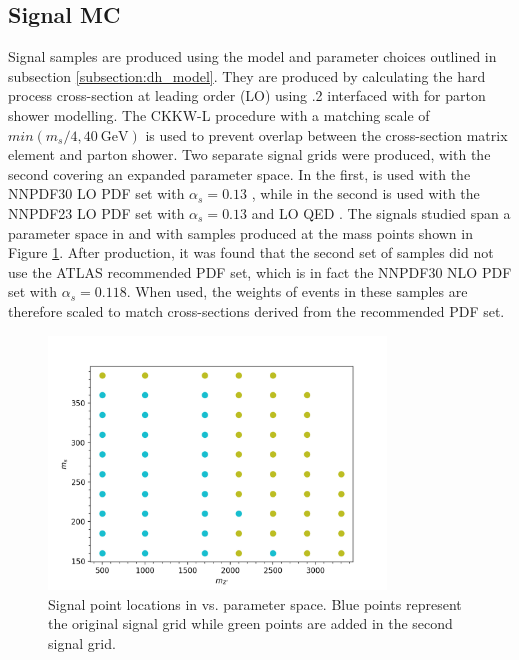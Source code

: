 \subsection{Signal MC}
\label{subsection:mc_signal}
Signal samples are produced using the model and parameter choices outlined in subsection \ref{subsection:dh_model}. They are produced by calculating the hard process cross-section at leading order (LO) using .2 \cite{MadGraph} interfaced with  \cite{Pythia} for parton shower modelling. The CKKW-L \cite{CKKW} procedure with a matching scale of $min(m_s/4, 40~\text{GeV})$ is used to prevent overlap between the cross-section matrix element and parton shower. Two separate signal grids were produced, with the second covering an expanded parameter space. In the first, \mgamc is used with the NNPDF30 LO PDF set with $\alpha_s = 0.13$ \cite{PDF30}, while in the second \mgamc is used with the NNPDF23 LO PDF set with $\alpha_s = 0.13$ and LO QED \cite{PDF23}. The signals studied span a parameter space in \ms and \mZp with samples produced at the mass points shown in Figure \ref{fig:signal_grid}. After production, it was found that the second set of samples did not use the ATLAS recommended PDF set, which is in fact the NNPDF30 NLO PDF set with $\alpha_s = 0.118$. When used, the weights of events in these samples are therefore scaled to match cross-sections derived from the recommended PDF set.

\begin{figure}[H]
    \centering
    \includegraphics[width=0.8\textwidth]{Figures/3/SignalGrid.png}
    \caption{Signal point locations in \ms vs. \mZp parameter space. Blue points represent the original signal grid while green points are added in the second signal grid.}
    \label{fig:signal_grid}
\end{figure}

